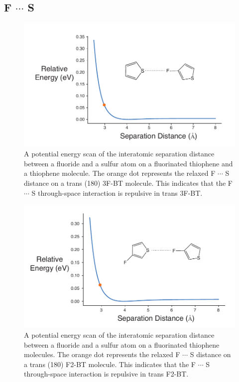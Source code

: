 \subsection{\texorpdfstring{F $\cdots$ S}{FS}}
\begin{figure}[hbt!]
    \centering
    \includegraphics{figures/append_aroma/ts_t_t_f1_copy.pdf}
    \caption[\texorpdfstring{F $\cdots$ S}{FS} 1F Through-space Calculation]{A potential energy scan of the interatomic separation distance between a fluoride and a sulfur atom on a fluorinated thiophene and a thiophene molecule. The orange dot represents the relaxed F $\cdots$ S distance on a trans (180\textdegree) 3F-BT molecule. This indicates that the F $\cdots$ S through-space interaction is repulsive in trans 3F-BT.}
    \label{fig:ts_t_t_f1}
\end{figure}

\begin{figure}[hbt!]
    \centering
    \includegraphics{figures/append_aroma/ts_2t_f1_copy.pdf}
    \caption[\texorpdfstring{F $\cdots$ S}{FS} 2F Through-space Calculation]{A potential energy scan of the interatomic separation distance between a fluoride and a sulfur atom on a fluorinated thiophene molecules. The orange dot represents the relaxed F $\cdots$ S distance on a trans (180\textdegree) F2-BT molecule. This indicates that the F $\cdots$ S through-space interaction is repulsive in trans F2-BT.}
    \label{fig:ts_2t_f1}
\end{figure}
\clearpage


